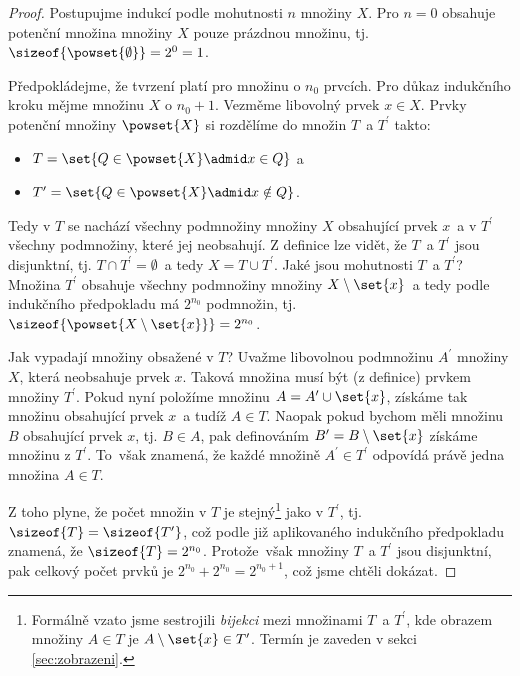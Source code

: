 \begin{proof}
    Postupujme indukcí podle mohutnosti $n$ množiny $X$. Pro $n=0$ obsahuje potenční množina množiny $X$ pouze prázdnou množinu, tj. $\sizeof{\powset{\emptyset}}=2^0=1$.\par
    Předpokládejme, že tvrzení platí pro množinu o $n_0$ prvcích. Pro důkaz indukčního kroku mějme množinu $X$ o $n_0+1$. Vezměme libovolný prvek $x \in X$. Prvky potenční množiny $\powset{X}$ si rozdělíme do množin $T$~a $T^\prime$ takto:
    \begin{itemize}
        \item $T=\set{Q \in \powset{X} \admid x\in Q}$ a
        \item $T^\prime=\set{Q \in \powset{X} \admid x\notin Q}$.
    \end{itemize}
    Tedy v $T$ se nachází všechny podmnožiny množiny $X$ obsahující prvek $x$~a v $T^\prime$ všechny podmnožiny, které jej neobsahují. Z definice lze vidět, že $T$~a $T^\prime$ jsou disjunktní, tj. $T \cap T^\prime=\emptyset$~a tedy $X=T\cup T^\prime$. Jaké jsou mohutnosti $T$~a $T^\prime$? Množina $T^\prime$ obsahuje všechny podmnožiny množiny $X\setminus\set{x}$~a tedy podle indukčního předpokladu má $2^{n_0}$ podmnožin, tj. $\sizeof{\powset{X\setminus\set{x}}}=2^{n_0}$.\par
    Jak vypadají množiny obsažené v $T$? Uvažme libovolnou podmnožinu $A^\prime$ množiny $X$, která neobsahuje prvek $x$. Taková množina musí být (z definice) prvkem množiny $T^\prime$. Pokud nyní položíme množinu $A=A^\prime\cup \set{x}$, získáme tak množinu obsahující prvek $x$~a tudíž $A\in T$. Naopak pokud bychom měli množinu $B$ obsahující prvek $x$, tj. $B\in A$, pak definováním $B^\prime=B\setminus \set{x}$ získáme množinu z $T^\prime$. To~však znamená, že každé množině $A^\prime\in T^\prime$ odpovídá právě jedna množina $A\in T$.\par
    Z toho plyne, že počet množin v $T$ je stejný\footnote{Formálně vzato jsme sestrojili \emph{bijekci} mezi množinami $T$~a $T^\prime$, kde obrazem množiny $A\in T$ je $A\setminus \set{x}\in T^\prime$. Termín je zaveden v sekci \ref{sec:zobrazeni}.} jako v $T^\prime$, tj. $\sizeof{T}=\sizeof{T^\prime}$, což podle již aplikovaného indukčního předpokladu znamená, že $\sizeof{T}=2^{n_0}$. Protože~však množiny $T$~a $T^\prime$ jsou disjunktní, pak celkový počet prvků je $2^{n_0}+2^{n_0}=2^{n_0+1}$, což jsme chtěli dokázat.
\end{proof}